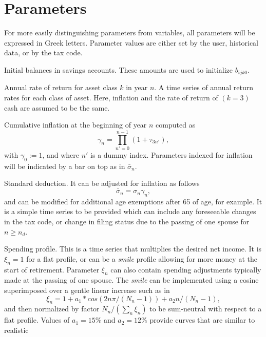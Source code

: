 \documentclass{article}[fleqn,12pt]
\begin{document}
\section{Parameters}
For more easily distinguishing parameters from variables, all parameters will be expressed in Greek letters.
Parameter values are either set by the user, historical data, or by the tax code.
\begin{description}[leftmargin=4em,style=multiline]
\item [$\beta{ij}$]
	Initial balances in savings accounts. These amounts are used to initialize $b_{ijk0}$.
\item [$\tau_{kn}$]
	Annual rate of return for asset class $k$ in year $n$.
	A time series of annual return rates for each class of asset.
	Here, inflation and the rate of return of $(k=3)$ cash are assumed to be the same.
\item [$\gamma_n$]
	Cumulative inflation at the beginning of year $n$ computed as
	\begin{equation}
		\gamma_n = \prod_{n' = 0}^{n-1} (1 + \tau_{3n'}),
	\end{equation}
	with $\gamma_0 := 1$, and where $n'$ is a dummy index.
	Parameters indexed for inflation will be indicated by a bar on top as in $\bar\sigma_n$.
\item [$\sigma_n$]
	Standard deduction. It can be adjusted for inflation as follows
	\begin{equation}
		\bar\sigma_n = \sigma_n \gamma_n,
	\end{equation}
	and can be modified for additional age exemptions after 65 of age, for example.
	It is a simple time series to be provided
	which can include any foreseeable changes in the tax code, or change in filing status due to the
	passing of one spouse for $n\ge n_d$.
\item [$\xi_{n}$]
	Spending profile. This is a time series that multiplies the desired net income. It is $\xi_n =1$ for
	a flat profile, or can be a {\em smile} profile allowing for more money at the start
	of retirement. Parameter
	$\xi_n$ can also contain spending adjustments typically made at the passing of one spouse.
	The {\em smile} can be implemented using a cosine superimposed over a gentle linear increase
	such as in
	\begin{equation}
		\xi_n = 1 + a_1*cos(2n\pi/(N_n-1)) + a_2n/(N_n-1),
	\end{equation}
	and then normalized by factor $N_n/(\sum_n \xi_n )$ to be sum-neutral with respect to a flat profile.
	Values of $a_1 = 15\%$ and $a_2=12\%$ provide curves that are similar to realistic

\end{description}
\end{document}
